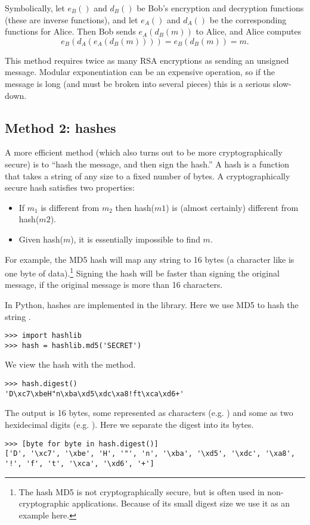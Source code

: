 Symbolically, let $e_B()$ and $d_B()$ be Bob's encryption and decryption functions (these are inverse functions), and let $e_A()$ and $d_A()$ be the corresponding functions for Alice.
Then Bob sends $e_A(d_B(m))$ to Alice, and Alice computes 
\[e_B(d_A(e_A(d_B(m)))) = e_B(d_B(m)) = m.\]

This method requires twice as many RSA encryptions as sending an unsigned message.
Modular exponentiation can be an expensive operation, so if the message is long (and must be broken into several pieces) this is a serious slow-down.


\subsection*{Method 2: hashes}
A more efficient method (which also turns out to be more cryptographically secure) is to ``hash the message, and then sign the hash.''
A hash is a function that takes a string of any size to a fixed number of bytes.
A cryptographically secure hash satisfies two properties:
\begin{itemize}
\item If $m_1$ is different from $m_2$ then hash($m1$) is (almost certainly) different from hash($m2$).
\item Given hash($m$), it is essentially impossible to find $m$.
\end{itemize}
For example, the MD5 hash will map any string to 16 bytes (a character like  is one byte of data).\footnote{
The hash MD5 is not cryptographically secure, but is often used in non-cryptographic applications. 
Because of its small digest size we use it as an example here.}
Signing the hash will be faster than signing the original message, if the original message is more than 16 characters.

In Python, hashes are implemented in the  library. 
Here we use MD5 to hash the string .
\begin{lstlisting}
>>> import hashlib
>>> hash = hashlib.md5('SECRET')
\end{lstlisting}
We view the hash with the  method.
\begin{lstlisting}
>>> hash.digest()
'D\xc7\xbeH"n\xba\xd5\xdc\xa8!ft\xca\xd6+'
\end{lstlisting}
The output is 16 bytes, some represented as characters (e.g. ) and some as two hexidecimal digits (e.g. ).
Here we separate the digest into its bytes.
\begin{lstlisting}
>>> [byte for byte in hash.digest()]
['D', '\xc7', '\xbe', 'H', '"', 'n', '\xba', '\xd5', '\xdc', '\xa8', '!', 'f', 't', '\xca', '\xd6', '+']
\end{lstlisting}

